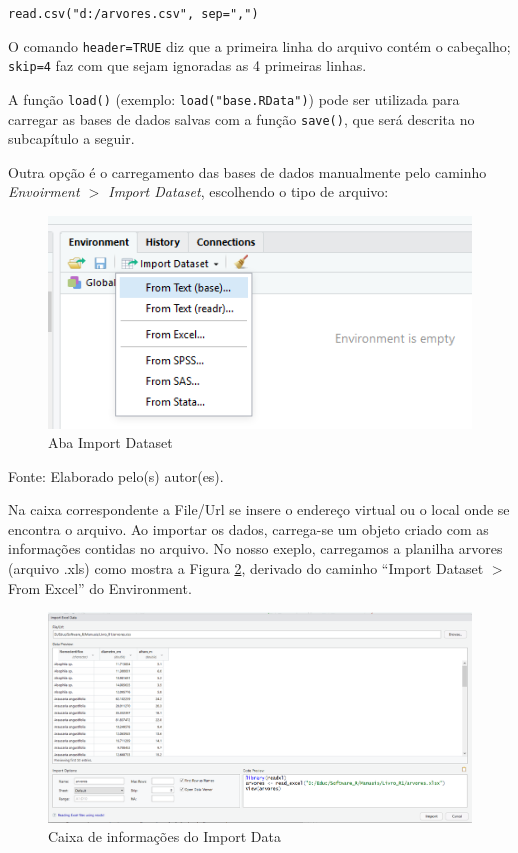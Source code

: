 \documentclass[12pt,brazil,oneside]{book}
\begin{document}
\texttt{read.csv("d:/arvores.csv",\ sep=",")}

O comando \texttt{header=TRUE} diz que a primeira linha do arquivo contém o cabeçalho; \texttt{skip=4} faz com que sejam ignoradas as 4 primeiras linhas.

A função \texttt{load()} (exemplo: \texttt{load("base.RData")}) pode ser utilizada para carregar as bases de dados salvas com a função \texttt{save()}, que será descrita no subcapítulo a seguir.

Outra opção é o carregamento das bases de dados manualmente pelo caminho \emph{Envoirment \(>\) Import Dataset}, escolhendo o tipo de arquivo:

\begin{figure}[H]

{\centering \includegraphics[width=0.7\linewidth]{r3} 

}

\caption{Aba Import Dataset}\label{fig:r3}
\end{figure}

Fonte: Elaborado pelo(s) autor(es).

Na caixa correspondente a File/Url se insere o endereço virtual ou o local onde se encontra o arquivo. Ao importar os dados, carrega-se um objeto criado com as informações contidas no arquivo. No nosso exeplo, carregamos a planilha arvores (arquivo .xls) como mostra a Figura \ref{fig:r4}, derivado do caminho ``Import Dataset \(>\) From Excel'' do Environment.

\begin{figure}[H]

{\centering \includegraphics[width=0.7\linewidth]{r4} 

}

\caption{Caixa de informações do Import Data}\label{fig:r4}
\end{figure}
\end{document}
